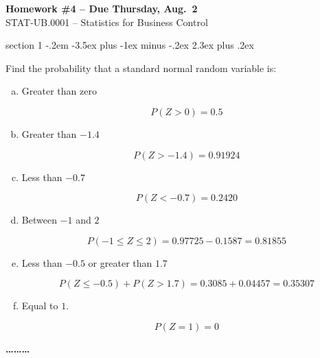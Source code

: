 \documentclass[answers,11pt]{exam}
\makeatletter
\newenvironment{problem}{\@startsection
       {section}
       {1}
       {-.2em}
       {-3.5ex plus -1ex minus -.2ex}
       {2.3ex plus .2ex}
       {\pagebreak[3]%
       \large\bf\noindent{Problem }
       }
       }
       {%
       \begin{center}\large\bf \ldots\ldots\ldots\end{center}}
\makeatother
\begin{document}
\begin{center}
  \large
  \textbf{Homework \#4 -- Due Thursday, Aug.~2} \\
  STAT-UB.0001 -- Statistics for Business Control \\
\end{center}


\thispagestyle{empty}


\begin{problem}{}

Find the probability that a standard normal random variable is:

\begin{enumerate}[(a)]

  \item Greater than zero

\begin{solution}
  \[
    P(Z > 0) = 0.5
  \]
\end{solution}

  \item Greater than $-1.4$

\begin{solution}
  \[
    P(Z > -1.4) = 0.91924
  \]
\end{solution}

  \item Less than $-0.7$

\begin{solution}
  \[
    P(Z < -0.7) = 0.2420
  \]
\end{solution}

  \item Between $-1$ and $2$

\begin{solution}
  \[
    P(-1 \leq Z \leq 2) = 0.97725 - 0.1587 = 0.81855
  \]
\end{solution}

  \item Less than $-0.5$ or greater than $1.7$
\begin{solution}
  \[
      P( Z \leq -0.5 ) + P(Z > 1.7 ) = 0.3085 + 0.04457 = 0.35307
  \]

\end{solution}

  \item Equal to $1$.

\begin{solution}
  \[
    P(Z = 1) = 0
  \]
\end{solution}

\end{enumerate}

\end{problem}
\end{document}
